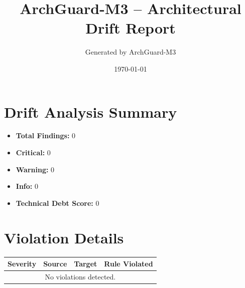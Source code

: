 \documentclass{article}
\title{ArchGuard-M3 -- Architectural Drift Report}
\author{Generated by ArchGuard-M3}
\date{\today}
\begin{document}
\maketitle

\section{Drift Analysis Summary}
\begin{itemize}
  \item \textbf{Total Findings:} 0
  \item \textbf{Critical:} 0
  \item \textbf{Warning:} 0
  \item \textbf{Info:} 0
  \item \textbf{Technical Debt Score:} 0
\end{itemize}

\section{Violation Details}
\begin{longtable}{|l|l|l|p{5cm}|}
\hline
\textbf{Severity} & \textbf{Source} & \textbf{Target} & \textbf{Rule Violated} \\
\hline\hline
\multicolumn{4}{|c|}{No violations detected.} \\
\hline
\end{longtable}
\end{document}
